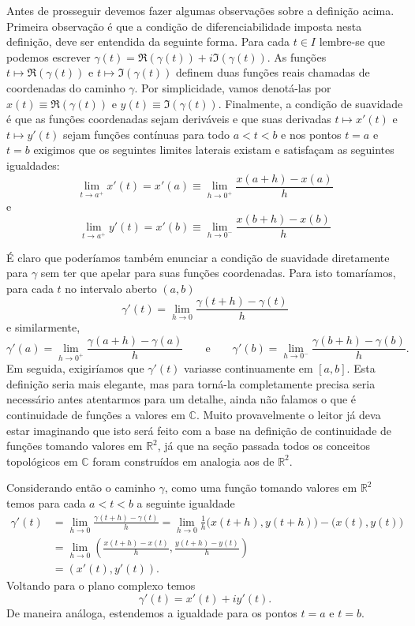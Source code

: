 Antes de prosseguir devemos fazer algumas observações sobre a definição acima.
Primeira observação é que a condição de diferenciabilidade imposta nesta definição, 
deve ser entendida da seguinte forma.
Para cada $t\in I$ lembre-se que podemos escrever $\gamma(t) = \Re(\gamma(t))+i\Im(\gamma(t))$.
As funções $t\longmapsto \Re(\gamma(t))$ e $t\longmapsto \Im(\gamma(t))$ definem
duas funções reais chamadas de coordenadas do caminho $\gamma$.
Por simplicidade, vamos denotá-las por $x(t)\equiv\Re(\gamma(t))$ e 
$y(t)\equiv\Im(\gamma(t))$. 
Finalmente, a condição de suavidade
é que as funções coordenadas sejam deriváveis e que suas derivadas 
$t\longmapsto x'(t)$ e $t\longmapsto y'(t)$ sejam funções contínuas para todo $a<t<b$ e 
nos pontos $t=a$ e $t=b$ exigimos que os seguintes limites laterais existam e satisfaçam as seguintes
igualdades:
\[
\lim_{t\to a^{+}}x'(t) = x'(a)\equiv\lim_{h\to 0^{+}}\frac{x(a+h)-x(a)}{h}  
\]
e
\[
\lim_{t\to a^{+}}y'(t) = x'(b)\equiv \lim_{h\to 0^{-}}\frac{x(b+h)-x(b)}{h}  
\]

É claro que poderíamos também enunciar a condição de suavidade diretamente para $\gamma$
sem ter que apelar para suas funções coordenadas. Para isto tomaríamos, para cada $t$ no intervalo aberto $(a,b)$
\[
\gamma'(t) = \lim_{h\to 0} \frac{\gamma(t+h)-\gamma(t)}{h}
\]
e similarmente, 
\[
\gamma'(a) = \lim_{h\to 0^{+}} \frac{\gamma(a+h)-\gamma(a)}{h}
\qquad \text{e}\qquad 
\gamma'(b) = \lim_{h\to 0^{-}} \frac{\gamma(b+h)-\gamma(b)}{h}.
\]
Em seguida, exigiríamos que $\gamma'(t)$ variasse continuamente em $[a,b]$.
Esta definição seria mais elegante, mas para torná-la completamente precisa seria necessário antes
atentarmos para um detalhe, ainda não falamos o que é continuidade de funções 
a valores em $\mathbb{C}$. Muito provavelmente 
o leitor já deva estar imaginando que isto será feito com a base na definição de continuidade
de funções tomando valores em $\mathbb{R}^2$, já que na seção passada todos os conceitos topológicos
em $\mathbb{C}$ foram construídos em analogia aos de $\mathbb{R}^2$. 

Considerando então o caminho $\gamma$, como uma função tomando valores em $\mathbb{R}^2$
temos para cada $a<t<b$ a seguinte igualdade 
\begin{align*}
\gamma'(t) 
&= 
\lim_{h\to 0} \frac{\gamma(t+h)-\gamma(t)}{h}
=
\lim_{h\to 0} \frac{1}{h}\big(x(t+h),y(t+h)\big) - \big(x(t),y(t)\big)
\\[0.3cm]
&=
\lim_{h\to 0} \left( \frac{x(t+h)-x(t)}{h},\frac{y(t+h)-y(t)}{h} \right)
\\[0.3cm]
&=
(x'(t),y'(t)).
\end{align*}
Voltando para o plano complexo temos
\[
\gamma'(t) = x'(t)+iy'(t).
\]
De maneira análoga, estendemos a igualdade para os pontos $t=a$ e $t=b$.



